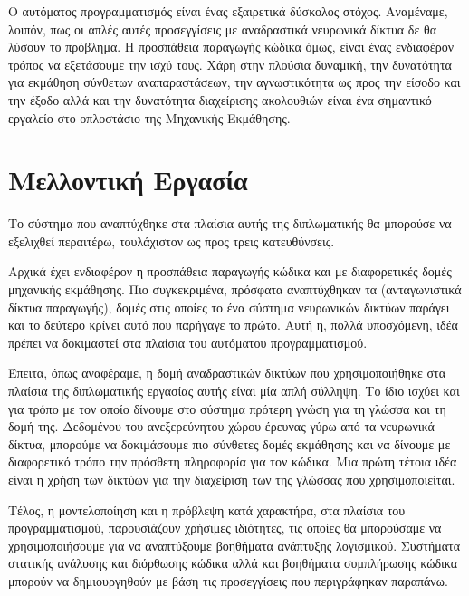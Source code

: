 Ο αυτόματος προγραμματισμός είναι ένας εξαιρετικά δύσκολος στόχος. 
Αναμέναμε, λοιπόν, πως οι απλές αυτές προσεγγίσεις με αναδραστικά νευρωνικά δίκτυα δε θα λύσουν το πρόβλημα.
Η προσπάθεια παραγωγής κώδικα όμως, είναι ένας ενδιαφέρον τρόπος να εξετάσουμε την ισχύ τους. 
Χάρη στην πλούσια δυναμική, την δυνατότητα για εκμάθηση σύνθετων αναπαραστάσεων, την αγνωστικότητα ως προς την είσοδο και την έξοδο αλλά και την δυνατότητα διαχείρισης ακολουθιών είναι ένα σημαντικό εργαλείο στο οπλοστάσιο της Μηχανικής Εκμάθησης. 


\section{Μελλοντική Εργασία}

Το σύστημα που αναπτύχθηκε στα πλαίσια αυτής της διπλωματικής θα μπορούσε να εξελιχθεί περαιτέρω, τουλάχιστον ως προς τρεις κατευθύνσεις.

Αρχικά έχει ενδιαφέρον η προσπάθεια παραγωγής κώδικα και με διαφορετικές δομές μηχανικής εκμάθησης.
Πιο συγκεκριμένα, πρόσφατα αναπτύχθηκαν τα  \cite{Goodfellow2014} (ανταγωνιστικά δίκτυα παραγωγής), δομές στις οποίες το ένα σύστημα νευρωνικών δικτύων παράγει και το δεύτερο κρίνει αυτό που παρήγαγε το πρώτο.
Αυτή η, πολλά υποσχόμενη, ιδέα πρέπει να δοκιμαστεί στα πλαίσια του αυτόματου προγραμματισμού.

Έπειτα, όπως αναφέραμε, η δομή αναδραστικών δικτύων που χρησιμοποιήθηκε στα πλαίσια της διπλωματικής εργασίας αυτής είναι μία απλή σύλληψη.
Το ίδιο ισχύει και για τρόπο με τον οποίο δίνουμε στο σύστημα πρότερη γνώση για τη γλώσσα και τη δομή της.
Δεδομένου του ανεξερεύνητου χώρου έρευνας γύρω από τα νευρωνικά δίκτυα, μπορούμε να δοκιμάσουμε πιο σύνθετες δομές εκμάθησης και να δίνουμε με διαφορετικό τρόπο την πρόσθετη πληροφορία για τον κώδικα.
Μια πρώτη τέτοια ιδέα είναι η χρήση των  \cite{Tai2015} δικτύων για την διαχείριση των  της γλώσσας που χρησιμοποιείται.

Τέλος, η μοντελοποίηση και η πρόβλεψη κατά χαρακτήρα, στα πλαίσια του προγραμματισμού, παρουσιάζουν χρήσιμες ιδιότητες, τις οποίες θα μπορούσαμε να χρησιμοποιήσουμε για να αναπτύξουμε βοηθήματα ανάπτυξης λογισμικού.
Συστήματα στατικής ανάλυσης και διόρθωσης κώδικα αλλά και βοηθήματα συμπλήρωσης κώδικα μπορούν να δημιουργηθούν με βάση τις προσεγγίσεις που περιγράφηκαν παραπάνω.